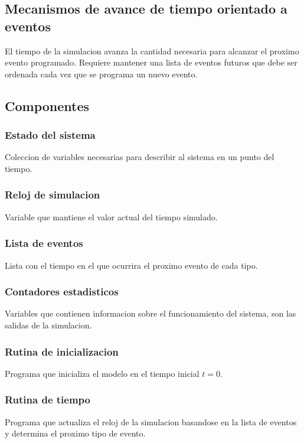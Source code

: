 \documentclass[a4paper]{article}
\begin{document}
\subsection*{Mecanismos de avance de tiempo orientado a eventos}
El tiempo de la simulacion avanza la cantidad necesaria para alcanzar el proximo
evento programado. Requiere mantener una lista de eventos futuros que debe ser ordenada cada vez que 
se programa un nuevo evento.

\subsection*{Componentes}
\subsubsection*{Estado del sistema}
Coleccion de variables necesarias para describir al sistema en un punto del tiempo.

\subsubsection*{Reloj de simulacion}
Variable que mantiene el valor actual del tiempo simulado.

\subsubsection*{Lista de eventos}
Lista con el tiempo en el que ocurrira el proximo evento de cada tipo.

\subsubsection*{Contadores estadisticos}
Variables que contienen informacion sobre el funcionamiento del sistema,
son las salidas de la simulacion.

\subsubsection*{Rutina de inicializacion}
Programa que inicializa el modelo en el tiempo inicial $t=0$.

\subsubsection*{Rutina de tiempo}
Programa que actualiza el reloj de la simulacion basandose en la lista de 
eventos y determina el proximo tipo de evento.
\end{document}
